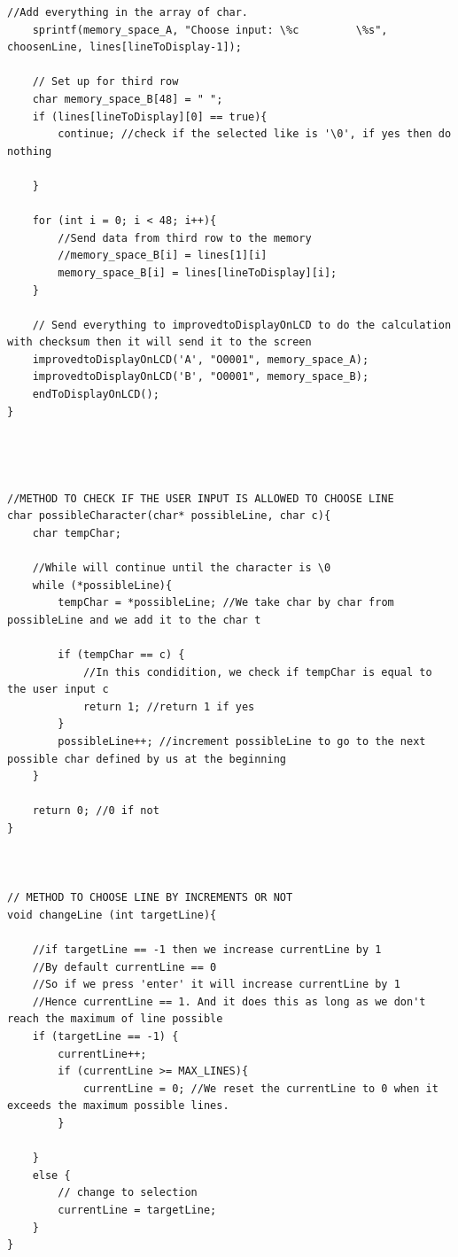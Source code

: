 \documentclass[a4paper,12pt]{article}
\begin{document}
\begin{lstlisting}[style=CStyle]
    //Add everything in the array of char.
	sprintf(memory_space_A, "Choose input: \%c         \%s", choosenLine, lines[lineToDisplay-1]);

	// Set up for third row
	char memory_space_B[48] = " ";
    if (lines[lineToDisplay][0] == true){
        continue; //check if the selected like is '\0', if yes then do nothing
       
    }
    
    for (int i = 0; i < 48; i++){
        //Send data from third row to the memory
        //memory_space_B[i] = lines[1][i]
        memory_space_B[i] = lines[lineToDisplay][i];
    }
	
	// Send everything to improvedtoDisplayOnLCD to do the calculation with checksum then it will send it to the screen
	improvedtoDisplayOnLCD('A', "O0001", memory_space_A);
	improvedtoDisplayOnLCD('B', "O0001", memory_space_B);
    endToDisplayOnLCD();
}




//METHOD TO CHECK IF THE USER INPUT IS ALLOWED TO CHOOSE LINE
char possibleCharacter(char* possibleLine, char c){
    char tempChar;
    
    //While will continue until the character is \0
    while (*possibleLine){
        tempChar = *possibleLine; //We take char by char from possibleLine and we add it to the char t
        
        if (tempChar == c) {
            //In this condidition, we check if tempChar is equal to the user input c
            return 1; //return 1 if yes
        }
        possibleLine++; //increment possibleLine to go to the next possible char defined by us at the beginning
    }

    return 0; //0 if not
}



// METHOD TO CHOOSE LINE BY INCREMENTS OR NOT
void changeLine (int targetLine){
    
    //if targetLine == -1 then we increase currentLine by 1
    //By default currentLine == 0
    //So if we press 'enter' it will increase currentLine by 1
    //Hence currentLine == 1. And it does this as long as we don't reach the maximum of line possible
	if (targetLine == -1) {
		currentLine++;
        if (currentLine >= MAX_LINES){
            currentLine = 0; //We reset the currentLine to 0 when it exceeds the maximum possible lines.
        }
		
	}
    else {
        // change to selection
        currentLine = targetLine;
    }
}



\end{lstlisting}
\end{document}
